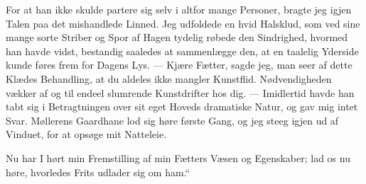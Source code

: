 \documentclass[12pt]{article}
\begin{document}
For at han ikke skulde partere sig selv i altfor mange Personer, bragte jeg igjen Talen paa det mishandlede Linned. Jeg udfoldede en hvid Halsklud, som ved sine mange sorte Striber og Spor af Hagen tydelig røbede den Sindrighed, hvormed han havde vidst, bestandig saaledes at sammenlægge den, at en taalelig Yderside kunde føres frem for Dagens Lys. --- Kjære Fætter, sagde jeg, man seer af dette Klædes Behandling, at du aldeles ikke mangler Kunstflid. Nødvendigheden vækker af og til endeel slumrende Kunstdrifter hos dig. --- Imidlertid havde han tabt sig i Betragtningen over sit eget Hoveds dramatiske Natur, og gav mig intet Svar. Møllerens Gaardhane lod sig høre første Gang, og jeg steeg igjen ud af Vinduet, for at opsøge mit Natteleie.

Nu har I hørt min Fremstilling af min Fætters Væsen og Egenskaber; lad os nu høre, hvorledes Frits udlader sig om ham.“
\end{document}
